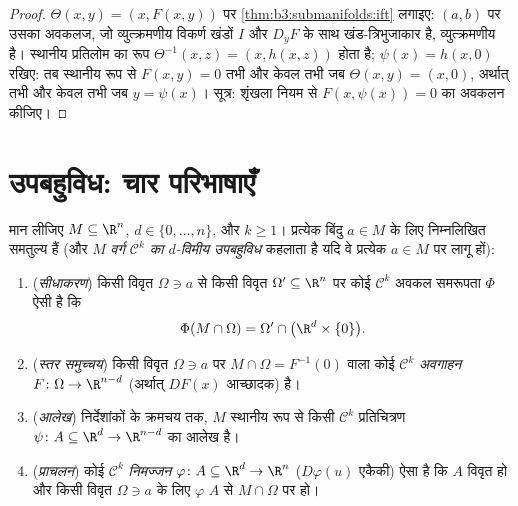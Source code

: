 \begin{proof}
$\Theta(x, y) = (x,
F(x,y))$ पर \cref{thm:b3:submanifolds:ift} लगाइए: $(a,b)$ पर उसका अवकलज, जो व्युत्क्रमणीय विकर्ण
खंडों $I$ और $D_yF$ के साथ खंड-त्रिभुजाकार है, व्युत्क्रमणीय है।
स्थानीय प्रतिलोम का रूप $\Theta^{-1}(x, z) = (x, h(x,
z))$ होता है; $\psi(x) = h(x, 0)$ रखिए: तब स्थानीय रूप
से $F(x, y) = 0$ तभी और केवल तभी जब $\Theta(x,y) = (x, 0)$, अर्थात् तभी और केवल तभी जब
$y = \psi(x)$। सूत्र: शृंखला नियम से $F(x, \psi(x)) = 0$ का अवकलन कीजिए।
\end{proof}

\section{उपबहुविध: चार परिभाषाएँ}

\begin{theorem}[तुल्य अभिलक्षण]
\label{thm:b3:submanifolds:characterizations}
मान लीजिए $M \subseteq \R^n$, $d \in \{0, \dots, n\}$, और $k \geq
1$। प्रत्येक बिंदु $a \in M$ के लिए
निम्नलिखित समतुल्य हैं (और $M$ \emph{वर्ग $\mathcal C^k$ का $d$-विमीय
उपबहुविध} कहलाता है यदि वे प्रत्येक $a
\in M$ पर लागू
हों):
\begin{enumerate}
  \item (\emph{सीधाकरण}) किसी विवृत $\Omega \ni a$ से किसी विवृत $\Omega' \subseteq \R^n$ पर
        कोई $\mathcal C^k$ अवकल समरूपता $\Phi$ ऐसी है कि
        \[
        \Phi(M\cap\Omega) = \Omega' \cap
        \bigl(\R^d\times\{0\}\bigr).
        \]
  \item (\emph{स्तर समुच्चय}) किसी विवृत $\Omega \ni a$ पर $M\cap\Omega = F^{-1}(0)$ वाला कोई
        $\mathcal C^k$ \emph{अवगाहन} $F \colon \Omega \to \R^{n-d}$ (अर्थात् $DF(x)$ आच्छादक) है।
  \item (\emph{आलेख}) निर्देशांकों के क्रमचय तक, $M$ स्थानीय
        रूप से किसी $\mathcal C^k$ प्रतिचित्रण $\psi
        \colon A \subseteq \R^d \to \R^{n-d}$ का आलेख है।
  \item (\emph{प्राचलन}) कोई $\mathcal C^k$ \emph{निमज्जन} $\varphi \colon A \subseteq \R^d \to
        \R^n$ ($D\varphi(u)$
        एकैकी) ऐसा है कि $A$ विवृत हो और किसी विवृत $\Omega \ni a$ के
        लिए $\varphi$ $A$ से $M \cap
        \Omega$ पर  हो।
\end{enumerate}
\end{theorem}

